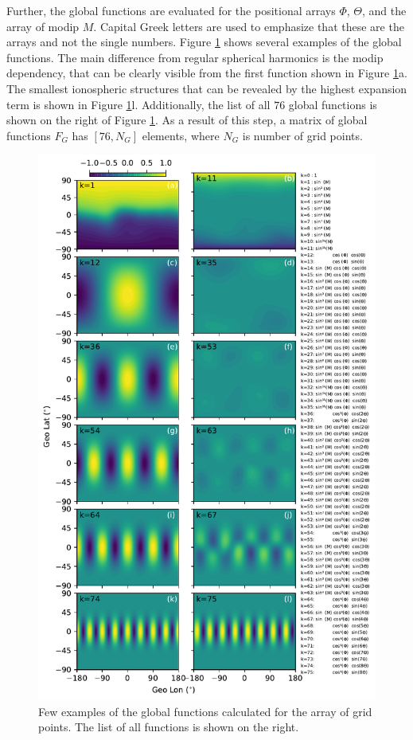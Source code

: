 \documentclass[draft]{agujournal2019}
\begin{document}
Further, the global functions are evaluated for the positional arrays $\Phi$, $\Theta$, and the array of modip $M$. Capital Greek letters are used to emphasize that these are the arrays and not the single numbers. Figure \ref{fig:global} shows several examples of the global functions. The main difference from regular spherical harmonics is the modip dependency, that can be clearly visible from the first function shown in Figure \ref{fig:global}a. The smallest ionospheric structures that can be revealed by the highest expansion term is shown in Figure \ref{fig:global}l. Additionally, the list of all $76$ global functions is shown on the right of Figure \ref{fig:global}. As a result of this step, a matrix of global functions $F_G$ has $[76, N_G]$ elements, where $N_G$ is number of grid points.

\begin{figure}[H]
  \includegraphics[scale=0.99]{Global_functions.pdf}
  \caption{Few examples of the global functions calculated for the array of grid points. The list of all functions is shown on the right.}
  \label{fig:global}
\end{figure}
\end{document}
